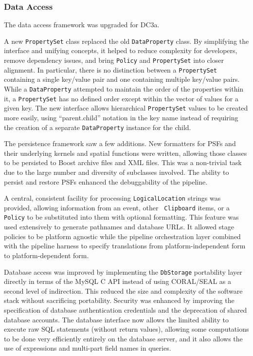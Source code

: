 
\subsubsection{Data Access}

The data access framework was upgraded for DC3a.

A new {\tt PropertySet} class replaced the old {\tt DataProperty} class.
By simplifying the interface and unifying concepts, it helped to reduce
complexity for developers, remove dependency issues, and bring
{\tt Policy} and {\tt PropertySet} into closer alignment.  In
particular, there is no distinction between a {\tt PropertySet}
containing a single key/value pair and one containing multiple key/value
pairs.  While a {\tt DataProperty} attempted to maintain the order of
the properties within it, a {\tt PropertySet} has no defined order
except within the vector of values for a given key.  The new interface
allows hierarchical {\tt PropertySet} values to be created more easily,
using ``parent.child'' notation in the key name instead of requiring the
creation of a separate {\tt DataProperty} instance for the child.

The persistence framework saw a few additions.  New formatters for PSFs
and their underlying kernels and spatial functions were written,
allowing those classes to be persisted to Boost archive files and XML
files.  This was a non-trivial task due to the large number and
diversity of subclasses involved.  The ability to persist and restore
PSFs enhanced the debuggability of the pipeline.

A central, consistent facility for processing {\tt LogicalLocation}
strings was provided, allowing information from an event, other {\tt
Clipboard} items, or a {\tt Policy} to be substituted into them with
optional formatting.  This feature was used extensively to generate
pathnames and database URLs.  It allowed stage policies to be
platform agnostic while the pipeline orchestration layer combined
with the pipeline harness to specify translations from
platform-independent form to platform-dependent form.

Database access was improved by implementing the {\tt DbStorage}
portability layer directly in terms of the MySQL C API instead of using
CORAL/SEAL as a second level of indirection.  This reduced the size and
complexity of the software stack without sacrificing portability.
Security was enhanced by improving the specification of database
authentication credentials and the deprecation of shared database
accounts.  The database interface now allows the limited ability to
execute raw SQL statements (without return values), allowing some
computations to be done very efficiently entirely on the database
server, and it also allows the use of expressions and multi-part field
names in queries.

